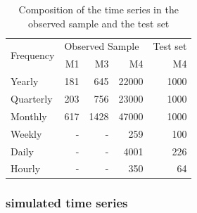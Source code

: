\documentclass[11pt,a4paper,]{article}
\begin{document}
\begin{table}[!h]
\centering
\caption{Composition of the time series in the observed sample and the test set}
\label{observedsample}
\begin{tabular}{l|rrr|r}
\multirow{2}{*}{Frequency} & \multicolumn{3}{l|}{Observed Sample} &  Test set \\ 
                  &   M1    &    M3   &    M4  &  M4 \\ \hline
  Yearly          &   181    &   645    &   22000   & 1000 \\
  Quarterly       &   203    &    756   &   23000   &  1000\\
  Monthly         &   617    &    1428   &  47000    &  1000\\
  Weekly          &   -    &   -    &   259   & 100 \\
  Daily           &   -    &   -    &   4001   & 226 \\
  Hourly          &   -    &    -   &  350    & 64\\ \hline
\end{tabular}
\end{table}

\subsubsection{simulated time series}\label{simulated-time-series}
\end{document}

